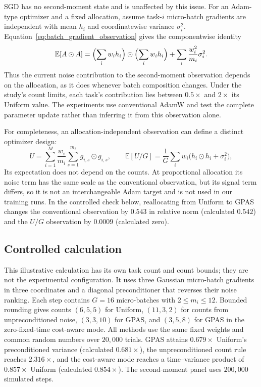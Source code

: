 SGD has no second-moment state and is unaffected by this issue. For an
Adam-type optimizer and a fixed allocation, assume task-$i$ micro-batch
gradients are independent with mean $h_i$ and coordinatewise variance
$\sigma_i^2$. Equation~\ref{eq:batch_gradient_observation} gives the
componentwise identity
\begin{equation}
    \mathbb E[A\odot A]
    =\Bigl(\sum_iw_i h_i\Bigr)\odot\Bigl(\sum_iw_i h_i\Bigr)
     +\sum_i\frac{w_i^2}{m_i}\sigma_i^2.
    \label{eq:conventional_batch_second_moment}
\end{equation}
Thus the current noise contribution to the second-moment observation depends
on the allocation, as it does whenever batch composition changes. Under the
study's count limits, each task's contribution lies between $0.5\times$ and
$2\times$ its Uniform value. The experiments use conventional AdamW and test
the complete parameter update rather than inferring it from this observation
alone.

For completeness, an allocation-independent observation can define a distinct
optimizer design:
\begin{equation}
    U=\sum_{i=1}^M\frac{w_i}{m_i}\sum_{s=1}^{m_i}
      g_{i,s}\odot g_{i,s},
    \qquad
    \mathbb E[U/G]=\frac1G\sum_iw_i
      \bigl(h_i\odot h_i+\sigma_i^2\bigr),
    \label{eq:taskwise_square_observation}
\end{equation}
Its expectation does not depend on the counts. At proportional allocation its
noise term has the same scale as the conventional observation, but its signal
term differs, so it is not an interchangeable Adam target and is not used in
our training runs. In the controlled check below, reallocating from Uniform to
GPAS changes the conventional observation by $0.543$ in relative norm
(calculated $0.542$) and the $U/G$ observation by $0.0009$ (calculated zero).

\subsection{Controlled calculation}
\label{app:controlled}

This illustrative calculation has its own task count and count bounds; they
are not the experimental configuration. It uses three Gaussian micro-batch
gradients in three coordinates and a diagonal preconditioner that reverses
their noise ranking. Each step contains $G=16$ micro-batches with
$2\leq m_i\leq12$. Bounded rounding gives counts $(6,5,5)$ for Uniform,
$(11,3,2)$ for counts from unpreconditioned noise, $(3,3,10)$ for GPAS, and
$(3,5,8)$ for GPAS in the zero-fixed-time cost-aware mode. All methods use the
same fixed weights and common random numbers over $20{,}000$ trials. GPAS
attains $0.679\times$ Uniform's preconditioned variance (calculated
$0.681\times$), the unpreconditioned count rule reaches $2.316\times$, and the
cost-aware mode reaches a time--variance product of $0.857\times$ Uniform
(calculated $0.854\times$). The second-moment panel uses $200{,}000$ simulated
steps.

